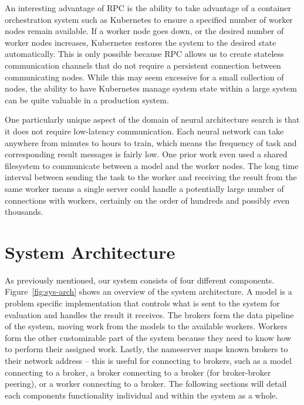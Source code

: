 \documentclass[conference]{IEEEtran}
\begin{document}
An interesting advantage of RPC is the ability to take advantage of a container
orchestration system such as Kubernetes \cite{43826} to ensure a specified
number of worker nodes remain available. If a worker node goes down, or the
desired number of worker nodes increases, Kubernetes restores the system to
the desired state automatically. This is only possible because RPC allows us to
create stateless communication channels that do not require a persistent connection
between communicating nodes. While this may seem excessive for a small collection
of nodes, the ability to have Kubernetes manage system state within a large
system can be quite valuable in a production system.

One particularly unique aspect of the domain of neural architecture search is
that it does not require low-latency communication. Each neural network can take
anywhere from minutes to hours to train, which means the frequency of
task and corresponding result messages is fairly low. One prior work
\cite{DBLP:conf/icml/RealMSSSTLK17} even used a shared filesystem to communicate
between a model and the worker nodes. The long time interval between sending the
task to the worker and receiving the result from the same worker means a single
server could handle a potentially large number of connections with workers,
certainly on the order of hundreds and possibly even thousands.

\section{System Architecture}
As previously mentioned, our system consists of four different components.
Figure~\ref{fig:sys-arch} shows an overview of the system architecture.  A model
is a problem specific implementation that controls what is sent to the system
for evaluation and handles the result it receives. The brokers form the data
pipeline of the system, moving work from the models to the available workers.
Workers form the other
customizable part of the system because they need to know how to perform their
assigned work.  Lastly, the nameserver maps known brokers to their network
address -- this is useful for connecting to brokers, such as a model connecting
to a broker, a broker connecting to a broker (for broker-broker peering), or a
worker connecting to a broker. The following sections will detail each
components functionality individual and within the system as a whole.
\end{document}
